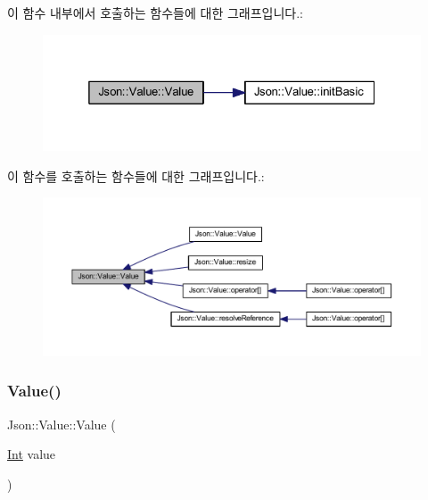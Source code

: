 이 함수 내부에서 호출하는 함수들에 대한 그래프입니다.\+:\nopagebreak
\begin{figure}[H]
\begin{center}
\leavevmode
\includegraphics[width=325pt]{class_json_1_1_value_ada6ba1369448fb0240bccc36efaa46f7_cgraph}
\end{center}
\end{figure}
이 함수를 호출하는 함수들에 대한 그래프입니다.\+:\nopagebreak
\begin{figure}[H]
\begin{center}
\leavevmode
\includegraphics[width=350pt]{class_json_1_1_value_ada6ba1369448fb0240bccc36efaa46f7_icgraph}
\end{center}
\end{figure}
\mbox{\label{class_json_1_1_value_a4744ae571fcf34f4b16a2257b3b3b585}} 
\subsubsection{\texorpdfstring{Value()}{Value()}\hspace{0.1cm}{\footnotesize\ttfamily [2/12]}}
{\footnotesize\ttfamily Json\+::\+Value\+::\+Value (\begin{DoxyParamCaption}\item[{\hyperlink{class_json_1_1_value_abdf7a7ff73eb130ffcab28504ffdb405}{Int}}]{value }\end{DoxyParamCaption})}



